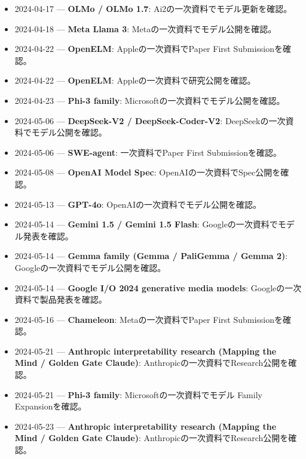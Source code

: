 \begin{itemize}[leftmargin=1.5em,itemsep=0.45em]
\item 2024-04-17 — \textbf{OLMo / OLMo 1.7}: Ai2の一次資料でモデル更新を確認。 \autocite{src-3d2fa83e273d}
\item 2024-04-18 — \textbf{Meta Llama 3}: Metaの一次資料でモデル公開を確認。 \autocite{src-f9616f30e8f5}
\item 2024-04-22 — \textbf{OpenELM}: Appleの一次資料でPaper First Submissionを確認。 \autocite{src-4d404eabda6e}
\item 2024-04-22 — \textbf{OpenELM}: Appleの一次資料で研究公開を確認。 \autocite{src-4d404eabda6e}
\item 2024-04-23 — \textbf{Phi-3 family}: Microsoftの一次資料でモデル公開を確認。 \autocite{src-e78721484043}
\item 2024-05-06 — \textbf{DeepSeek-V2 / DeepSeek-Coder-V2}: DeepSeekの一次資料でモデル公開を確認。 \autocite{src-d9d69089eb6a}
\item 2024-05-06 — \textbf{SWE-agent}: 一次資料でPaper First Submissionを確認。 \autocite{src-1c9f1d22c176}
\item 2024-05-08 — \textbf{OpenAI Model Spec}: OpenAIの一次資料でSpec公開を確認。 \autocite{src-d1406200c99e}
\item 2024-05-13 — \textbf{GPT-4o}: OpenAIの一次資料でモデル公開を確認。 \autocite{src-2d3a533e91db}
\item 2024-05-14 — \textbf{Gemini 1.5 / Gemini 1.5 Flash}: Googleの一次資料でモデル発表を確認。 \autocite{src-28ee6f0f00f4}
\item 2024-05-14 — \textbf{Gemma family (Gemma / PaliGemma / Gemma 2)}: Googleの一次資料でモデル公開を確認。 \autocite{src-0395647db4a8}
\item 2024-05-14 — \textbf{Google I/O 2024 generative media models}: Googleの一次資料で製品発表を確認。 \autocite{src-0f33134a9129}
\item 2024-05-16 — \textbf{Chameleon}: Metaの一次資料でPaper First Submissionを確認。 \autocite{src-e1259b3c0804}
\item 2024-05-21 — \textbf{Anthropic interpretability research (Mapping the Mind / Golden Gate Claude)}: Anthropicの一次資料でResearch公開を確認。 \autocite{src-4ff5ab7d45bc}
\item 2024-05-21 — \textbf{Phi-3 family}: Microsoftの一次資料でモデル Family Expansionを確認。 \autocite{src-e78721484043}
\item 2024-05-23 — \textbf{Anthropic interpretability research (Mapping the Mind / Golden Gate Claude)}: Anthropicの一次資料でResearch公開を確認。 \autocite{src-4ff5ab7d45bc}

\end{itemize}
